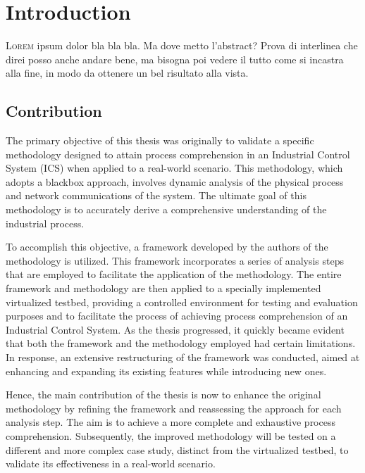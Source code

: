 \chapter{Introduction}
\label{intro}
\linenumbers

\lettrine[lines=2]{L}{orem} ipsum dolor bla bla bla. Ma dove metto l'abstract? Prova di interlinea che direi posso anche andare bene, ma bisogna poi vedere il tutto come si incastra alla fine, in modo da ottenere un bel risultato alla vista. 

\section{Contribution}
\label{sec:contribution}

The primary objective of this thesis was originally to validate a specific methodology designed to attain process comprehension in an Industrial Control System (ICS) when applied to a real-world scenario. This methodology, which adopts a blackbox approach, involves dynamic analysis of the physical process and network communications of the system. The ultimate goal of this methodology is to accurately derive a comprehensive understanding of the industrial process.

\bigskip
To accomplish this objective, a framework developed by the authors of the methodology is utilized. This framework incorporates a series of analysis steps that are employed to facilitate the application of the methodology. The entire framework and methodology are then applied to a specially implemented virtualized testbed, providing a controlled environment for testing and evaluation purposes and to facilitate the process of achieving process comprehension of an Industrial Control System.\newline
As the thesis progressed, it quickly became evident that both the framework and the methodology employed had certain limitations. In response, an extensive restructuring of the framework was conducted, aimed at enhancing and expanding its existing features while introducing new ones.

\bigskip
Hence, the main contribution of the thesis is now to enhance the original methodology by refining the framework and reassessing the approach for each analysis step. The aim is to achieve a more complete and exhaustive process comprehension. Subsequently, the improved methodology will be tested on a different and more complex case study, distinct from the virtualized testbed, to validate its effectiveness in a real-world scenario.

